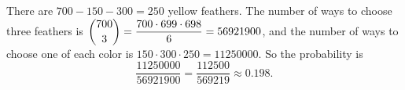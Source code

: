 There are $700-150-300=250$ yellow feathers. The number of ways to choose three feathers is $\dbinom{700}{3}=\dfrac{700\cdot699\cdot698}{6}=56921900$, and the number of ways to choose one of each color is $150\cdot300\cdot250=11250000$. So the probability is
\[\dfrac{11250000}{56921900}=\boxed{\dfrac{112500}{569219}}\approx0.198.\]
